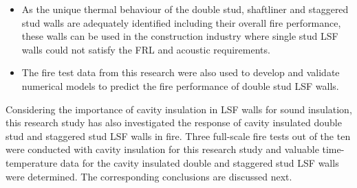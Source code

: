 \begin{itemize}
	\item As the unique thermal behaviour of the double stud, shaftliner and staggered stud walls are adequately identified including their overall fire performance, these walls can be used in the construction industry where single stud LSF walls could not satisfy the FRL and acoustic requirements.
	\item The fire test data from this research were also used to develop and validate numerical models to predict the fire performance of double stud LSF walls.  
\end{itemize}

Considering the importance of cavity insulation in LSF walls for sound insulation, this research study has also investigated the response of cavity insulated double stud and staggered stud LSF walls in fire. Three full-scale fire tests out of the ten were conducted with cavity insulation for this research study and valuable time-temperature data for the cavity insulated double and staggered stud LSF walls were determined. The corresponding conclusions are discussed next. 

